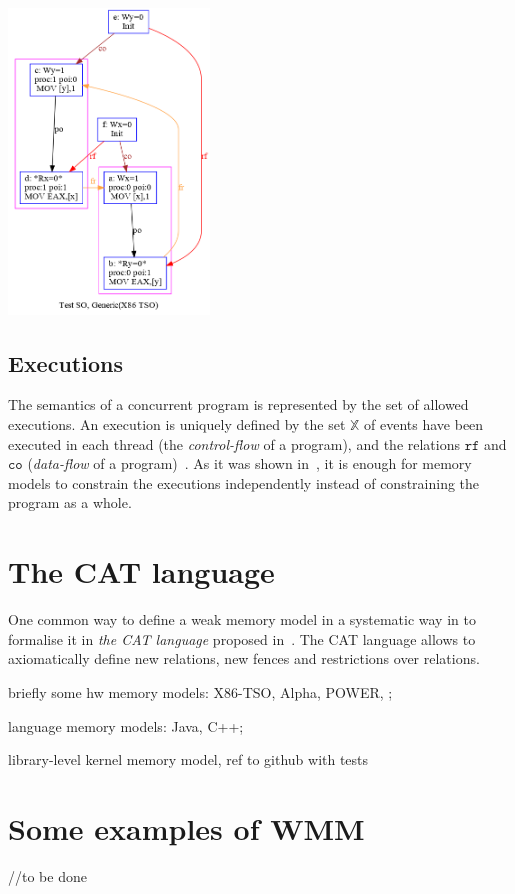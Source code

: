\includegraphics[width=0.4\textwidth]{img/my/simple_wmm_x86.png}
\label{simple_wmm_x86_pic}

\subsection{Executions}
\label{ch:wmm:model:executions}

The semantics of a concurrent program is represented by the set of allowed executions.
An execution is uniquely defined by the set $\mathbb{X}$ of events have been executed in each thread (the \textit{control-flow} of a program), and the relations $\mathtt{rf}$ and $\mathtt{co}$ (\textit{data-flow} of a program)~\cite{alglave2010shared}. As it was shown in~\cite{wickerson2017automatically}, it is enough for memory models to constrain the executions independently instead of constraining the program as a whole.

\section{The CAT language}

One common way to define a weak memory model in a systematic way in to formalise it in \textit{the CAT language} proposed in~\cite{alglave2016syntax}. The CAT language allows to axiomatically define new relations, new fences and restrictions over relations.




briefly some hw memory models: X86-TSO, Alpha, POWER, ;

language memory models: Java, C++;

library-level kernel memory model, ref to github with tests



\section{Some examples of WMM}

//to be done